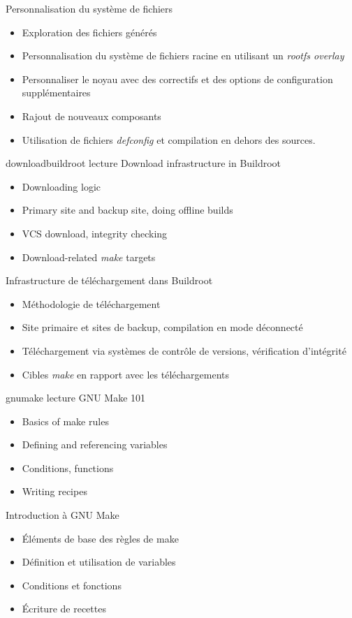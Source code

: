 {Personnalisation du système de fichiers}
{
  \begin{itemize}
  \item Exploration des fichiers générés
  \item Personnalisation du système de fichiers racine en utilisant un {\em rootfs overlay}
  \item Personnaliser le noyau avec des correctifs et des options de
	configuration supplémentaires
  \item Rajout de nouveaux composants
  \item Utilisation de fichiers {\em defconfig} et compilation en
	dehors des sources.
  \end{itemize}
}
{downloadbuildroot}
{lecture}
{Download infrastructure in Buildroot}
{
  \begin{itemize}
  \item Downloading logic
  \item Primary site and backup site, doing offline builds
  \item VCS download, integrity checking
  \item Download-related {\em make} targets
  \end{itemize}
}
{Infrastructure de téléchargement dans Buildroot}
{
  \begin{itemize}
  \item Méthodologie de téléchargement
  \item Site primaire et sites de backup, compilation en mode déconnecté
  \item Téléchargement via systèmes de contrôle de versions,
	vérification d'intégrité
  \item Cibles {\em make} en rapport avec les téléchargements
  \end{itemize}
}
{gnumake}
{lecture}
{GNU Make 101}
{
  \begin{itemize}
  \item Basics of make rules
  \item Defining and referencing variables
  \item Conditions, functions
  \item Writing recipes
  \end{itemize}
}
{Introduction à GNU Make}
{
  \begin{itemize}
  \item Éléments de base des règles de make
  \item Définition et utilisation de variables
  \item Conditions et fonctions
  \item Écriture de recettes
  \end{itemize}
}
